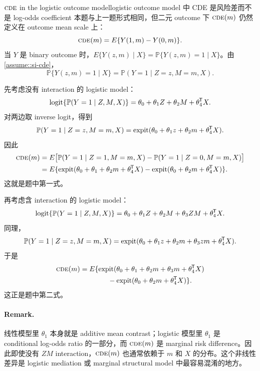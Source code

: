 \begin{exercisesolution}{$\textsc{cde}$ in the logistic outcome model}{logistic outcome model 中 CDE 是风险差而不是 log-odds coefficient}
本题与上一题形式相同，但二元 outcome 下 $\textsc{cde}(m)$ 仍然定义在 outcome mean scale 上：
\[
\textsc{cde}(m)=E\{Y(1,m)-Y(0,m)\}.
\]
当 $Y$ 是 binary outcome 时，$E\{Y(z,m)\mid X\}=\mathbb{P}\{Y(z,m)=1\mid X\}$。由 \cref{assume::si-cde}，
\[
\mathbb{P}\{Y(z,m)=1\mid X\}
=
\mathbb{P}(Y=1\mid Z=z,M=m,X).
\]

先考虑没有 interaction 的 logistic model：
\[
\textup{logit}\{\mathbb{P}(Y=1\mid Z,M,X)\}
=
\theta_0+\theta_1 Z+\theta_2 M+\theta_4^{\mkern-1.5mu\mathsf{T}} X.
\]
对两边取 inverse logit，得到
\[
\mathbb{P}(Y=1\mid Z=z,M=m,X)
=
\textup{expit}(\theta_0+\theta_1 z+\theta_2 m+\theta_4^{\mkern-1.5mu\mathsf{T}} X).
\]
因此
\begin{align*}
\textsc{cde}(m)
&=
E\bigl[
\mathbb{P}(Y=1\mid Z=1,M=m,X)
-
\mathbb{P}(Y=1\mid Z=0,M=m,X)
\bigr]\\
&=
E\{
\textup{expit}(\theta_0+\theta_1+\theta_2 m+\theta_4^{\mkern-1.5mu\mathsf{T}} X)
-
\textup{expit}(\theta_0+\theta_2 m+\theta_4^{\mkern-1.5mu\mathsf{T}} X)
\}.
\end{align*}
这就是题中第一式。

再考虑含 interaction 的 logistic model：
\[
\textup{logit}\{\mathbb{P}(Y=1\mid Z,M,X)\}
=
\theta_0+\theta_1 Z+\theta_2 M+\theta_3 ZM+\theta_4^{\mkern-1.5mu\mathsf{T}} X.
\]
同理，
\[
\mathbb{P}(Y=1\mid Z=z,M=m,X)
=
\textup{expit}(\theta_0+\theta_1 z+\theta_2 m+\theta_3 zm+\theta_4^{\mkern-1.5mu\mathsf{T}} X).
\]
于是
\begin{align*}
\textsc{cde}(m)
&=
E\{
\textup{expit}(\theta_0+\theta_1+\theta_2 m+\theta_3 m+\theta_4^{\mkern-1.5mu\mathsf{T}} X)\\
&\qquad\qquad
-
\textup{expit}(\theta_0+\theta_2 m+\theta_4^{\mkern-1.5mu\mathsf{T}} X)
\}.
\end{align*}
这正是题中第二式。

\paragraph{Remark.}
线性模型里 $\theta_1$ 本身就是 additive mean contrast；logistic 模型里 $\theta_1$ 是 conditional log-odds ratio 的一部分，而 $\textsc{cde}(m)$ 是 marginal risk difference。因此即使没有 $ZM$ interaction，$\textsc{cde}(m)$ 也通常依赖于 $m$ 和 $X$ 的分布。这个非线性差异是 logistic mediation 或 marginal structural model 中最容易混淆的地方。
\end{exercisesolution}
